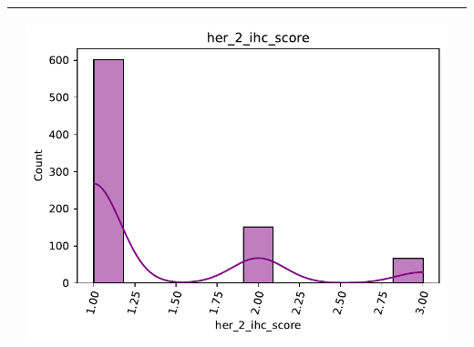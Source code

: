 \begin{table}[!htb]
\begin{threeparttable}
\begin{tabular}{p{2.5cm} p{7cm} p{6.5cm}}
			& \begin{center}\includegraphics[width=1\linewidth]{NOTEBOOK/IMAGENES_DESCRIPTIVAS/17_her_2_ihc_score}\end{center}
			\\ \hline
			
		\end{tabular}
	\end{threeparttable}
\end{table}

